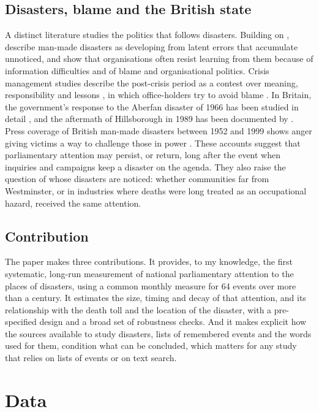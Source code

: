 \documentclass[11pt,a4paper]{article}
\begin{document}
\subsection{Disasters, blame and the British state}
A distinct literature studies the politics that follows disasters. Building on \citet{Turner1978}, \citet{PidgeonOLeary2000} describe man-made disasters as developing from latent errors that accumulate unnoticed, and show that organisations often resist learning from them because of information difficulties and of blame and organisational politics. Crisis management studies describe the post-crisis period as a contest over meaning, responsibility and lessons \citep{Boin2005,Boin2009}, in which office-holders try to avoid blame \citep{Hood2011}. In Britain, the government's response to the Aberfan disaster of 1966 has been studied in detail \citep{McLeanJohnes2000,Johnes2000}, and the aftermath of Hillsborough in 1989 has been documented by \citet{Scraton1999}. Press coverage of British man-made disasters between 1952 and 1999 shows anger giving victims a way to challenge those in power \citep{PanttiWahlJorgensen2011}. These accounts suggest that parliamentary attention may persist, or return, long after the event when inquiries and campaigns keep a disaster on the agenda. They also raise the question of whose disasters are noticed: whether communities far from Westminster, or in industries where deaths were long treated as an occupational hazard, received the same attention.

\subsection{Contribution}
The paper makes three contributions. It provides, to my knowledge, the first systematic, long-run measurement of national parliamentary attention to the places of disasters, using a common monthly measure for 64 events over more than a century. It estimates the size, timing and decay of that attention, and its relationship with the death toll and the location of the disaster, with a pre-specified design and a broad set of robustness checks. And it makes explicit how the sources available to study disasters, lists of remembered events and the words used for them, condition what can be concluded, which matters for any study that relies on lists of events or on text search.

\section{Data}
\label{sec:data}
\end{document}
